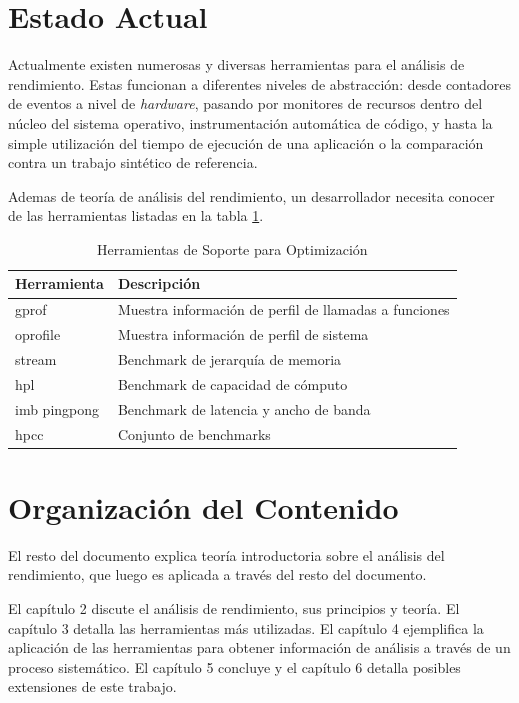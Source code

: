 \documentclass[a4paper]{report}
\begin{document}
\section{Estado Actual}

Actualmente existen numerosas y diversas herramientas para el análisis de rendimiento.
Estas funcionan a diferentes niveles de abstracción: desde contadores de eventos
a nivel de {\it hardware}, pasando por monitores de recursos dentro del núcleo del sistema operativo,
instrumentación automática de código, y hasta la simple utilización del tiempo de ejecución 
de una aplicación o la comparación contra un trabajo sintético de referencia.

\bigskip

Ademas de teoría de análisis del rendimiento, un desarrollador necesita
conocer de las herramientas listadas en la tabla \ref{table:tools}.

\begin{table}[H]
    \caption{Herramientas de Soporte para Optimización}
    \centering
    \begin{tabular}{|l|l|}\hline
      {\bf Herramienta} & {\bf Descripción} \\ \hline
      gprof & Muestra información de perfil de llamadas a funciones \\ \hline
      oprofile & Muestra información de perfil de sistema \\ \hline
      stream & Benchmark de jerarquía de memoria \\ \hline
      hpl & Benchmark de capacidad de cómputo \\ \hline
      imb pingpong & Benchmark de latencia y ancho de banda \\ \hline
      hpcc & Conjunto de benchmarks \\ \hline
    \end{tabular}
    \label{table:tools}
\end{table}

\section{Organización del Contenido}

El resto del documento explica teoría introductoria sobre el análisis del rendimiento, que luego es
aplicada a través del resto del documento.

\bigskip

El capítulo 2 discute el análisis de rendimiento, sus
principios y teoría. El capítulo 3 detalla las herramientas más
utilizadas. El capítulo 4 ejemplifica la aplicación de las herramientas
para obtener información de análisis a través de un proceso sistemático.
El capítulo 5 concluye y el capítulo 6 detalla posibles extensiones de este trabajo.
\end{document}
